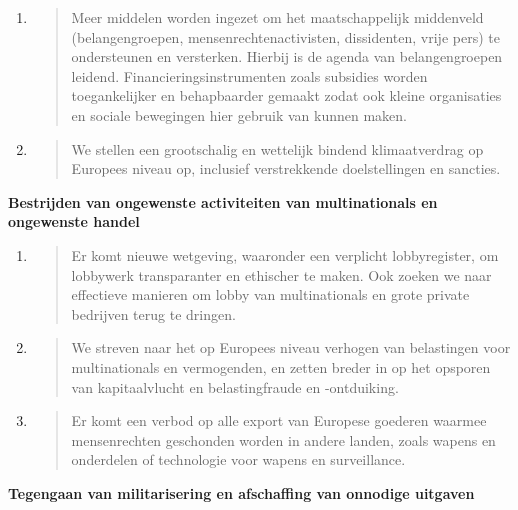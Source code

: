 \begin{enumerate}
\def\labelenumi{\arabic{enumi}.}
\item
  \begin{quote}
  Meer middelen worden ingezet om het maatschappelijk middenveld
  (belangengroepen, mensenrechtenactivisten, dissidenten, vrije pers) te
  ondersteunen en versterken. Hierbij is de agenda van belangengroepen
  leidend. Financieringsinstrumenten zoals subsidies worden
  toegankelijker en behapbaarder gemaakt zodat ook kleine organisaties
  en sociale bewegingen hier gebruik van kunnen maken.
  \end{quote}
\item
  \begin{quote}
  We stellen een grootschalig en wettelijk bindend klimaatverdrag op
  Europees niveau op, inclusief verstrekkende doelstellingen en
  sancties.
  \end{quote}
\end{enumerate}

\textbf{Bestrijden van ongewenste activiteiten van multinationals en
ongewenste handel}

\begin{enumerate}
\def\labelenumi{\arabic{enumi}.}
\item
  \begin{quote}
  Er komt nieuwe wetgeving, waaronder een verplicht lobbyregister, om
  lobbywerk transparanter en ethischer te maken. Ook zoeken we naar
  effectieve manieren om lobby van multinationals en grote private
  bedrijven terug te dringen.
  \end{quote}
\item
  \begin{quote}
  We streven naar het op Europees niveau verhogen van belastingen voor
  multinationals en vermogenden, en zetten breder in op het opsporen van
  kapitaalvlucht en belastingfraude en -ontduiking.
  \end{quote}
\item
  \begin{quote}
  Er komt een verbod op alle export van Europese goederen waarmee
  mensenrechten geschonden worden in andere landen, zoals wapens en
  onderdelen of technologie voor wapens en surveillance.
  \end{quote}
\end{enumerate}

\textbf{Tegengaan van militarisering en afschaffing van onnodige
uitgaven}

